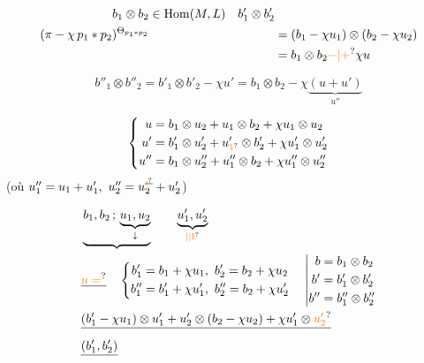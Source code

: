 \[
\begin{aligned}
 b_1\otimes b_2&\in\operatorname{Hom}(M,L)& b'_1\otimes b'_2&\\
 (\pi-\chi\,p_1\ast p_2)^{\Theta_{p_1\ast p_2}}& &
 &=(b_1-\chi u_1)\otimes(b_2-\chi u_2)\\
 &&&=b_1\otimes b_2\unsure{-|+}\chi u
\end{aligned}
\]

\[
b''_1\otimes b''_2=b'_1\otimes b'_2-\chi u'
=b_1\otimes b_2-\chi\underbrace{(u+u')}_{u''}
\]


\[
\left\{\begin{aligned}
u&=b_1\otimes u_2+u_1\otimes b_2+\chi u_1\otimes u_2\\
u'&=b'_1\otimes u'_2+u'_{\unsure{1}}\otimes b'_2+\chi u'_1\otimes u'_2\\
u''&=b_1\otimes u''_2+u''_1\otimes b_2+\chi u''_1\otimes u''_2
\end{aligned}\right.
\]
(où $u''_1=u_1+u'_1,\ u''_2=u_2^{\deleted{\unsure{\prime}}}+u'_2$)

\[
\begin{aligned}
&\underbrace{b_1,b_2\,;\,\underbrace{u_1,u_2}_{\downarrow}} \qquad
 \underbrace{u'_1,u'_2}_{\unsure{\vert|\mathrm{I}}}\\
&\deleted{\unsure{u=}}\quad
\left\{\begin{aligned}
 b'_1&=b_1+\chi u_1,\ b'_2=b_2+\chi u_2\\
 b''_1&=b'_1+\chi u'_1,\ b''_2=b_2+\chi u'_2
\end{aligned}\right.
\quad\left|\begin{aligned}
 b&=b_1\otimes b_2\\ b'&=b'_1\otimes b'_2\\ b''&=b''_1\otimes b''_2
\end{aligned}\right.\\
&\deleted{(b'_1-\chi u_1)\otimes u'_1+u'_2\otimes(b_2-\chi u_2)+\chi u'_1\otimes\unsure{u'_2}}\\
&\deleted{(b'_1,b'_2)}
\end{aligned}
\]

